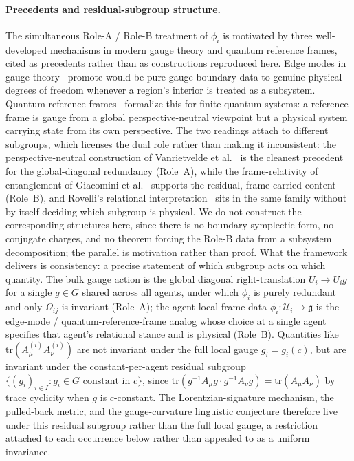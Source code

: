 \documentclass[11pt]{article}
\begin{document}
\paragraph{Precedents and residual-subgroup structure.}
\label{sec:dual_role_rigor}
The simultaneous Role-A / Role-B treatment of $\phi_i$ is motivated by three well-developed mechanisms in modern gauge theory and quantum reference frames, cited as precedents rather than as constructions reproduced here. Edge modes in gauge theory~\cite{DonnellyFreidel2016} promote would-be pure-gauge boundary data to genuine physical degrees of freedom whenever a region's interior is treated as a subsystem. Quantum reference frames~\cite{BartlettRudolphSpekkens2007, Vanrietvelde2020, giacomini2019qrf} formalize this for finite quantum systems: a reference frame is gauge from a global perspective-neutral viewpoint but a physical system carrying state from its own perspective. The two readings attach to different subgroups, which licenses the dual role rather than making it inconsistent: the perspective-neutral construction of Vanrietvelde et al.~\cite{Vanrietvelde2020} is the cleanest precedent for the global-diagonal redundancy (Role~A), while the frame-relativity of entanglement of Giacomini et al.~\cite{giacomini2019qrf} supports the residual, frame-carried content (Role~B), and Rovelli's relational interpretation~\cite{Rovelli1996} sits in the same family without by itself deciding which subgroup is physical. We do not construct the corresponding structures here, since there is no boundary symplectic form, no conjugate charges, and no theorem forcing the Role-B data from a subsystem decomposition; the parallel is motivation rather than proof. What the framework delivers is consistency: a precise statement of which subgroup acts on which quantity. The bulk gauge action is the global diagonal right-translation $U_i \to U_i g$ for a single $g \in G$ shared across all agents, under which $\phi_i$ is purely redundant and only $\Omega_{ij}$ is invariant (Role~A); the agent-local frame data $\phi_i: \mathcal{U}_i \to \mathfrak{g}$ is the edge-mode / quantum-reference-frame analog whose choice at a single agent specifies that agent's relational stance and is physical (Role~B). Quantities like $\mathrm{tr}(A^{(i)}_\mu A^{(i)}_\nu)$ are not invariant under the full local gauge $g_i = g_i(c)$, but are invariant under the constant-per-agent residual subgroup $\{(g_i)_{i \in I} : g_i \in G \text{ constant in } c\}$, since $\mathrm{tr}(g^{-1}A_\mu g \cdot g^{-1}A_\nu g) = \mathrm{tr}(A_\mu A_\nu)$ by trace cyclicity when $g$ is $c$-constant. The Lorentzian-signature mechanism, the pulled-back metric, and the gauge-curvature linguistic conjecture therefore live under this residual subgroup rather than the full local gauge, a restriction attached to each occurrence below rather than appealed to as a uniform invariance.
\end{document}
